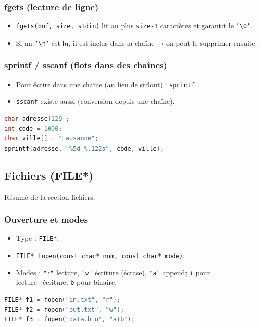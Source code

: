 \subsubsection{fgets (lecture de ligne)}
\begin{itemize}
  \item \texttt{fgets(buf, size, stdin)} lit au plus \texttt{size-1} caractères et garantit le \texttt{'\textbackslash 0'}.
  \item Si un \texttt{'\textbackslash n'} est lu, il est inclus dans la chaîne → on peut le supprimer ensuite.
\end{itemize}

\subsubsection{sprintf / sscanf (flots dans des chaînes)}
\begin{itemize}
  \item Pour écrire dans une chaîne (au lieu de stdout) : \texttt{sprintf}.
  \item \texttt{sscanf} existe aussi (conversion depuis une chaîne).
\end{itemize}

\begin{lstlisting}[language=C]
char adresse[129];
int code = 1000;
char ville[] = "Lausanne";
sprintf(adresse, "%5d %.122s", code, ville);
\end{lstlisting}

\subsection{Fichiers (FILE*)}
Résumé de la section fichiers. 

\subsubsection{Ouverture et modes}
\begin{itemize}
  \item Type : \texttt{FILE*}.
  \item \texttt{FILE* fopen(const char* nom, const char* mode)}.
  \item Modes : \texttt{"r"} lecture, \texttt{"w"} écriture (écrase), \texttt{"a"} append; \texttt{+} pour lecture+écriture; \texttt{b} pour binaire. 
\end{itemize}

\begin{lstlisting}[language=C]
FILE* f1 = fopen("in.txt", "r");
FILE* f2 = fopen("out.txt", "w");
FILE* f3 = fopen("data.bin", "a+b");
\end{lstlisting}

